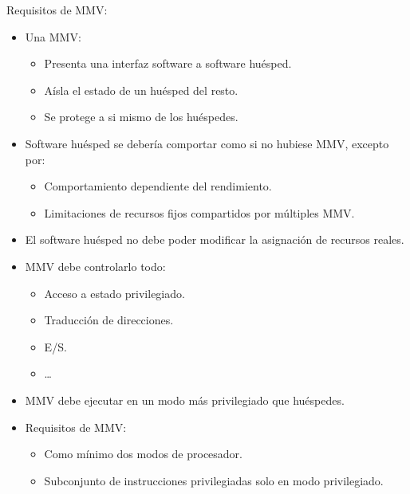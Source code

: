 \documentclass[12pt, twoside, openright]{report} %
\begin{document}
    Requisitos de MMV:

    \begin{itemize}
    
    \item
      Una MMV:

      \begin{itemize}
      
      \item
        Presenta una interfaz software a software huésped.
      \item
        Aísla el estado de un huésped del resto.
      \item
        Se protege a si mismo de los huéspedes.
      \end{itemize}
    \item
      Software huésped se debería comportar como si no hubiese MMV,
      excepto por:

      \begin{itemize}
      
      \item
        Comportamiento dependiente del rendimiento.
      \item
        Limitaciones de recursos fijos compartidos por múltiples MMV.
      \end{itemize}
    \item
      El software huésped no debe poder modificar la asignación de
      recursos reales.
    \item
      MMV debe controlarlo todo:

      \begin{itemize}
      
      \item
        Acceso a estado privilegiado.
      \item
        Traducción de direcciones.
      \item
        E/S.

      \item
        \ldots{}
      \end{itemize}
    \item
      MMV debe ejecutar en un modo más privilegiado que huéspedes.
    \item
      Requisitos de MMV:

      \begin{itemize}
      
      \item
        Como mínimo dos modos de procesador.
      \item
        Subconjunto de instrucciones privilegiadas solo en modo
        privilegiado.
      \end{itemize}
    \end{itemize}
\end{document}
